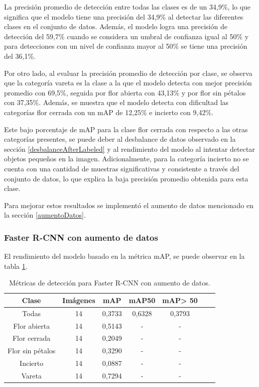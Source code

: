La precisión promedio de detección entre todas las clases es de un 34,9\%, lo que significa que el modelo tiene una precisión del 34,9\% al detectar las diferentes clases en el conjunto de datos. Además, el modelo logra una precisión de detección del 59,7\% cuando se considera un umbral de confianza igual al 50\% y para detecciones con un nivel de confianza mayor al 50\% se tiene una precisión del 36,1\%.

Por otro lado, al evaluar la precisión promedio de detección por clase, se observa que la categoría vareta es la clase a la que el modelo detecta con mejor precisión promedio con 69,5\%, seguida por flor abierta con 43,13\% y por flor sin pétalos con 37,35\%. Además, se muestra que el modelo detecta con dificultad las categorías flor cerrada con un mAP de 12,25\% e incierto con 9,42\%.

Este bajo porcentaje de mAP para la clase flor cerrada con respecto a las otras categorías presentes, se puede deber al desbalance de datos observado en la sección \ref{desbalanceAfterLabeled} y al rendimiento del modelo al intentar detectar objetos pequeños en la imagen. Adicionalmente, para la categoría incierto no se cuenta con una cantidad de muestras significativas y consistente a través del conjunto de datos, lo que explica la baja precisión promedio obtenida para esta clase.

Para mejorar estos resultados se implementó el aumento de datos mencionado en la sección \ref{aumentoDatos}.

\subsubsection{Faster R-CNN con aumento de datos}

El rendimiento del modelo basado en la métrica mAP, se puede observar en la tabla \ref{tab:resultadosFasterConAug}. 

\begin{table}[h]
	\centering
	\caption{Métricas de detección para Faster R-CNN con aumento de datos.}
	\begin{tabular}{c c c c c c c}    
		\toprule
		\textbf{Clase}&\textbf{Imágenes}&\textbf{mAP}&\textbf{mAP50}&\textbf{mAP> 50}\\
		\midrule
		Todas & 14 & 0,3733 & 0,6328 & 0,3793\\
		Flor abierta & 14 & 0,5143 & - & - \\
		Flor cerrada & 14 & 0,2049 & - & - \\
		Flor sin pétalos & 14 & 0,3290 & - & - \\
		Incierto & 14 & 0,0887 & - & - \\
		Vareta & 14 & 0,7294 & - & - \\		
		\bottomrule
		\hline
	\end{tabular}
	\label{tab:resultadosFasterConAug}
\end{table}

